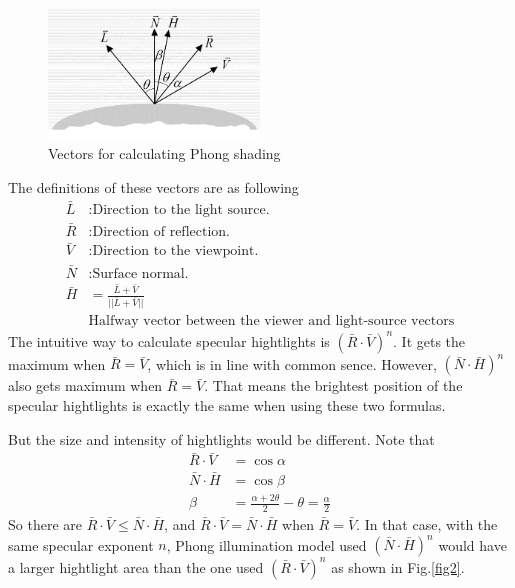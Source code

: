 \documentclass[12pt,a4paper]{article}
\makeatletter
\newtheorem*{solution}{Solution}
\theoremstyle{definition}
\numberwithin{equation}{section}
\numberwithin{figure}{section}
\renewenvironment{solution}[1][Solution] {\par\pushQED{\qed}\normalfont\topsep6\p@\@plus6\p@\relax\trivlist\item[\hskip\labelsep\bfseries#1\@addpunct{.}]\ignorespaces}{\popQED\endtrivlist\@endpefalse} \makeatother
\makeatother
\begin{document}
\begin{solution}
	\begin{figure}[h]
		\centering
		\includegraphics[width=0.5\textwidth]{PhongVectors.png}
		\caption{Vectors for calculating Phong shading}
		\label{fig1}
	\end{figure}
	The definitions of these vectors are as following
	\begin{align*}
	\bar{L}&: \text{Direction to the light source.}\\
	\bar{R}&:\text{Direction of reflection.}\\
	\bar{V}&:\text{Direction to the viewpoint.}\\
	\bar{N}&: \text{Surface normal.}\\
	\bar{H}&= \frac{\bar{L}+\bar{V}}{||\bar{L}+\bar{V}||}\\
	& \text{Halfway vector between the viewer and light-source vectors}
	\end{align*}
	The intuitive way to calculate specular hightlights is $(\bar{R}\cdot \bar{V})^n$. It gets the maximum when $\bar{R}=\bar{V}$, which is in line with common sence. However, $(\bar{N}\cdot \bar{H})^n$ also gets maximum when $\bar{R}=\bar{V}$. That means the brightest position of the specular hightlights is exactly the same when using these two formulas.
	
	But the size and intensity of hightlights would be different. Note that
	\begin{align*}
		\bar{R}\cdot \bar{V} &= \cos\alpha\\
		\bar{N}\cdot \bar{H} &= \cos\beta\\
		\beta &= \frac{\alpha + 2\theta}{2} - \theta = \frac{\alpha}{2}
	\end{align*}
	So there are $\bar{R}\cdot \bar{V} \leq \bar{N}\cdot \bar{H}$, and $\bar{R}\cdot \bar{V} = \bar{N}\cdot \bar{H}$ when $\bar{R} = \bar{V}$. In that case, with the same specular exponent $n$, Phong illumination model used $(\bar{N}\cdot \bar{H})^n$ would have a larger hightlight area than the one used $(\bar{R}\cdot \bar{V})^n$ as shown in Fig.\ref{fig2}.
	

\end{solution}
\end{document}
